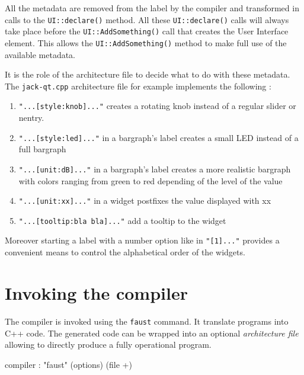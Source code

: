 \documentclass[a4paper,10pt]{book}
\begin{document}
All the metadata are removed from the label by the compiler and 
transformed in calls to the \lstinline'UI::declare()' method. All these 
\lstinline'UI::declare()' calls will always take place before the \lstinline'UI::AddSomething()' 
call that creates the User Interface element. This allows the 
\lstinline'UI::AddSomething()'  method to make full use of the available metadata.

It is the role of the architecture file to decide what to do with these 
metadata. The \lstinline'jack-qt.cpp' architecture file for example implements the 
following :
\begin{enumerate}
\item \lstinline'"...[style:knob]..."' creates a rotating knob instead of a regular 
slider or nentry.
\item \lstinline'"...[style:led]..."' in a bargraph's label creates a small LED instead 
of a full bargraph
\item \lstinline'"...[unit:dB]..."' in a bargraph's label creates a more realistic 
bargraph with colors ranging from green to red depending of the level of 
the value
\item \lstinline'"...[unit:xx]..."' in a widget postfixes the value displayed with xx
\item \lstinline'"...[tooltip:bla bla]..."' add a tooltip to the widget
\end{enumerate}

Moreover starting a label with a number option like in \lstinline'"[1]..."' provides
a convenient means to control the alphabetical order of the widgets.








\chapter{Invoking the \faust compiler}
The \faust compiler is invoked using the \texttt{faust} command. It translate \faust programs into C++ code.
The generated code can be wrapped into an optional \emph{architecture file} allowing to directly produce a fully operational program.

\begin{syntdiag}
compiler : "faust" (options) (file +)
\end{syntdiag}
\end{document}
